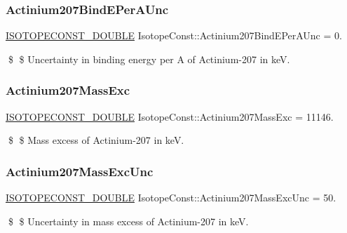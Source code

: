 \subsubsection{\texorpdfstring{Actinium207\+Bind\+E\+Per\+A\+Unc}{Actinium207BindEPerAUnc}}
{\footnotesize\ttfamily \mbox{\hyperlink{group___isotope_const-_macros_ga8f45a7272ce02c0b4c65c44636ed719a}{I\+S\+O\+T\+O\+P\+E\+C\+O\+N\+S\+T\+\_\+\+D\+O\+U\+B\+LE}} Isotope\+Const\+::\+Actinium207\+Bind\+E\+Per\+A\+Unc = 0.}

\$ \$ Uncertainty in binding energy per A of Actinium-\/207 in keV. \mbox{\label{group___isotope_const-_actinium-_ac207_ga413c9cb6e026db3c492a8f39105569e9}} 
\subsubsection{\texorpdfstring{Actinium207\+Mass\+Exc}{Actinium207MassExc}}
{\footnotesize\ttfamily \mbox{\hyperlink{group___isotope_const-_macros_ga8f45a7272ce02c0b4c65c44636ed719a}{I\+S\+O\+T\+O\+P\+E\+C\+O\+N\+S\+T\+\_\+\+D\+O\+U\+B\+LE}} Isotope\+Const\+::\+Actinium207\+Mass\+Exc = 11146.}

\$ \$ Mass excess of Actinium-\/207 in keV. \mbox{\label{group___isotope_const-_actinium-_ac207_ga9f777e3c53b837f6eef326786f5e4aee}} 
\subsubsection{\texorpdfstring{Actinium207\+Mass\+Exc\+Unc}{Actinium207MassExcUnc}}
{\footnotesize\ttfamily \mbox{\hyperlink{group___isotope_const-_macros_ga8f45a7272ce02c0b4c65c44636ed719a}{I\+S\+O\+T\+O\+P\+E\+C\+O\+N\+S\+T\+\_\+\+D\+O\+U\+B\+LE}} Isotope\+Const\+::\+Actinium207\+Mass\+Exc\+Unc = 50.}

\$ \$ Uncertainty in mass excess of Actinium-\/207 in keV. \mbox{\label{group___isotope_const-_actinium-_ac207_ga56b9db7f315bd2feed7385cf2b15d26a}} 
